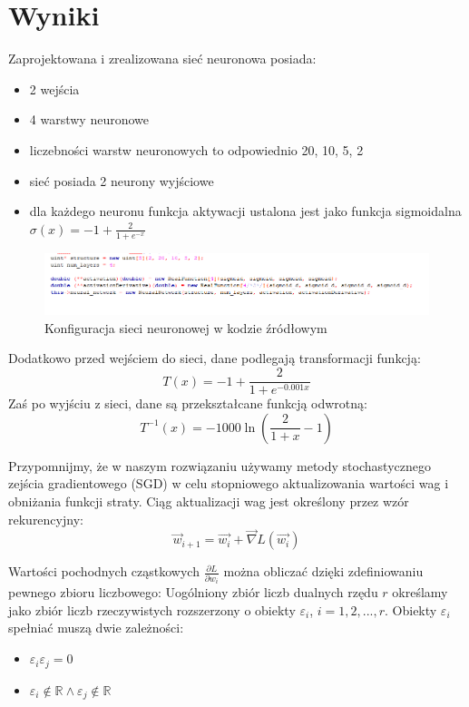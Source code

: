 \documentclass{classrep}
\begin{document}
\section{Wyniki}
{
	Zaprojektowana i zrealizowana sieć neuronowa posiada:
	\begin{itemize}
	          \item 2 wejścia
           	\item 4 warstwy neuronowe
                     \item liczebności warstw neuronowych to odpowiednio 20, 10, 5, 2
                     \item sieć posiada 2 neurony wyjściowe
                     \item dla każdego neuronu funkcja aktywacji ustalona jest jako funkcja sigmoidalna $\sigma (x) = -1+\frac{2}{1+e^{-x}}$ 

           \end{itemize}
      \begin{figure}[!htbp]
            \centering
            \includegraphics[width=\textwidth, width=150mm]{nn_set.png}
            \caption{Konfiguracja sieci neuronowej w kodzie źródłowym}
            \label{nn_set}
     \end{figure}

        Dodatkowo przed wejściem do sieci, dane podlegają transformacji funkcją:
	$$T(x) = -1+\frac{2}{1+e^{-0.001x}}$$
       Zaś po wyjściu z sieci, dane są przekształcane funkcją odwrotną:
          $$T^{-1}(x) = -1000 \ln (\frac{2}{1+x}-1)$$

      Przypomnijmy, że w naszym rozwiązaniu używamy  metody stochastycznego zejścia gradientowego (SGD) w celu stopniowego aktualizowania wartości wag i obniżania funkcji straty.
      Ciąg aktualizacji wag jest określony przez wzór rekurencyjny:
      $$\vec{w}_{i+1} = \vec{w_i} + \vec{\nabla}L(\vec{w_i})$$ 

      Wartości pochodnych cząstkowych $\frac{\partial L}{\partial w_i}$ można obliczać dzięki zdefiniowaniu pewnego zbioru liczbowego:
      Uogólniony zbiór liczb dualnych rzędu $r$ określamy jako zbiór liczb rzeczywistych rozszerzony o obiekty $\varepsilon_i$, $i=1,2,...,r.$
      Obiekty $\varepsilon_{i}$ spełniać muszą dwie zależności:
    \begin{itemize}
            \item $\varepsilon_{i} \varepsilon_{j} = 0$
	 \item  $\varepsilon_{i} \notin \mathbb{R} \land  \varepsilon_{j} \notin \mathbb{R}$ 
     \end{itemize}

}
\end{document}
